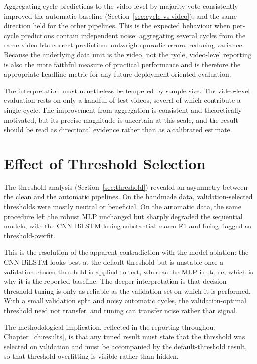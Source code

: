 Aggregating cycle predictions to the video level by majority vote consistently
improved the automatic baseline (Section~\ref{sec:cycle-vs-video}), and the same
direction held for the other pipelines. This is the expected behaviour when
per-cycle predictions contain independent noise: aggregating several cycles from
the same video lets correct predictions outweigh sporadic errors, reducing
variance. Because the underlying data unit is the video, not the cycle,
video-level reporting is also the more faithful measure of practical
performance and is therefore the appropriate headline metric for any future
deployment-oriented evaluation.

The interpretation must nonetheless be tempered by sample size. The video-level
evaluation rests on only a handful of test videos, several of which contribute a
single cycle. The improvement from aggregation is consistent and theoretically
motivated, but its precise magnitude is uncertain at this scale, and the result
should be read as directional evidence rather than as a calibrated estimate.

\section{Effect of Threshold Selection}
\label{sec:disc-threshold}

The threshold analysis (Section~\ref{sec:threshold}) revealed an asymmetry
between the clean and the automatic pipelines. On the handmade data,
validation-selected thresholds were mostly neutral or beneficial. On the
automatic data, the same procedure left the robust MLP unchanged but sharply
degraded the sequential models, with the CNN-BiLSTM losing substantial macro-F1
and being flagged as threshold-overfit.

This is the resolution of the apparent
contradiction with the model ablation: the CNN-BiLSTM looks best at the default
threshold but is unstable once a validation-chosen threshold is applied to
test, whereas the MLP is stable, which is why it is the reported baseline.
The deeper interpretation is that decision-threshold tuning is only as reliable
as the validation set on which it is performed. With a small validation split
and noisy automatic cycles, the validation-optimal threshold need not transfer,
and tuning can transfer noise rather than signal. 

The methodological
implication, reflected in the reporting throughout Chapter~\ref{ch:results}, is
that any tuned result must state that the threshold was selected on validation
and must be accompanied by the default-threshold result, so that threshold
overfitting is visible rather than hidden.

